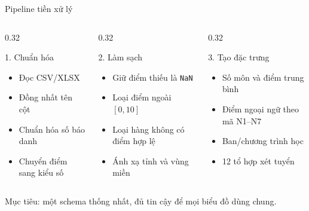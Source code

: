 \documentclass[aspectratio=169,11pt]{beamer}
\begin{document}
\begin{frame}{Pipeline tiền xử lý}
  \small
  \begin{columns}[T,onlytextwidth]
    \begin{column}{0.32\textwidth}
      \begin{block}{1. Chuẩn hóa}
        \begin{itemize}
          \item Đọc CSV/XLSX
          \item Đồng nhất tên cột
          \item Chuẩn hóa số báo danh
          \item Chuyển điểm sang kiểu số
        \end{itemize}
      \end{block}
    \end{column}
    \begin{column}{0.32\textwidth}
      \begin{block}{2. Làm sạch}
        \begin{itemize}
          \item Giữ điểm thiếu là \texttt{NaN}
          \item Loại điểm ngoài $[0,10]$
          \item Loại hàng không có điểm hợp lệ
          \item Ánh xạ tỉnh và vùng miền
        \end{itemize}
      \end{block}
    \end{column}
    \begin{column}{0.32\textwidth}
      \begin{block}{3. Tạo đặc trưng}
        \begin{itemize}
          \item Số môn và điểm trung bình
          \item Điểm ngoại ngữ theo mã N1--N7
          \item Ban/chương trình học
          \item 12 tổ hợp xét tuyển
        \end{itemize}
      \end{block}
    \end{column}
  \end{columns}
  \vspace{0.3cm}
  \centering
  \alert{Mục tiêu: một schema thống nhất, đủ tin cậy để mọi biểu đồ dùng chung.}
\end{frame}
\end{document}
